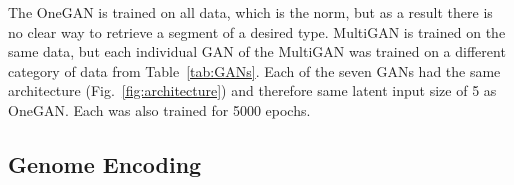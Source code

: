 

The OneGAN is trained on all data, which is the norm, but as a result there is no clear way to retrieve a segment of a desired type.
MultiGAN is trained on the same data, but each individual GAN of the MultiGAN was trained on a different category of data from Table~\ref{tab:GANs}. Each of the seven GANs had the same architecture (Fig.~\ref{fig:architecture}) and therefore same latent input size of 5 as OneGAN. Each was also trained for 5000 epochs.






\subsection{Genome Encoding}
\label{sec:genome}





